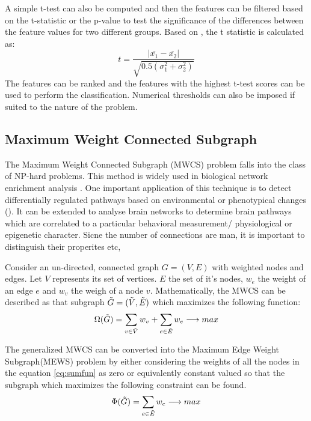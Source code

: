 \documentclass[msthesis.tex]{subfiles}
\begin{document}
A simple t-test can also be computed and then the features can be filtered based on the t-statistic or the p-value to test the significance of the differences between the feature values for two different groups. Based on \cite{inza2004filter}, the t statistic is calculated as:
\begin{equation}
    t = \frac{|\overline{x_1} - \overline{x_2}|}{\sqrt{0.5(\sigma_{1}^2 + \sigma_{2}^2)}}
\end{equation}
The features can be ranked and the features with the highest t-test scores can be used to perform the classification. Numerical thresholds can also be imposed if suited to the nature of the problem. 


\subsection{Maximum Weight Connected Subgraph}
\label{sec:MEWS}
The Maximum Weight Connected Subgraph (MWCS) problem falls into the class of NP-hard problems. This method is widely used in biological network enrichment analysis \cite{DBLP:journals/corr/LobodaAS16}. One important application of this technique is to detect
differentially regulated pathways based on environmental or phenotypical changes (\cite{althaus2014algorithms}). It can be extended to analyse brain networks to determine brain pathways which are correlated to a particular behavioral measurement/ physiological or epigenetic character. Sicne the number of connections are man, it is important to distinguish their properites etc, 

Consider an un-directed, connected graph $G = (V,E)$ with weighted nodes and edges. Let $V$ represents its set of vertices. $E$ the set of it's nodes, $w_e$ the weight of an edge $e$ and $w_v$ the weigh of a node $v$. Mathematically, the MWCS can be described as that subgraph  $\Tilde{G} = (\Tilde{V}, \Tilde{E})$ which maximizes the following function:
\begin{equation}
\label{eq:sumfun}
    \Omega(\Tilde{G}) = \sum_{v \in \Tilde{V}} w_v + \sum_{e \in \Tilde{E}} w_e \longrightarrow max
\end{equation}

The generalized MWCS can be converted into the Maximum Edge Weight Subgraph(MEWS) problem by either considering the weights of all the nodes in the equation \ref{eq:sumfun} as zero or equivalently constant valued so that the subgraph which maximizes the following constraint can be found.
\begin{equation}
    \label{eq:sumews}
    \Phi(\Tilde{G}) = \sum_{e \in \Tilde{E}} w_e \longrightarrow max
\end{equation}
\end{document}
